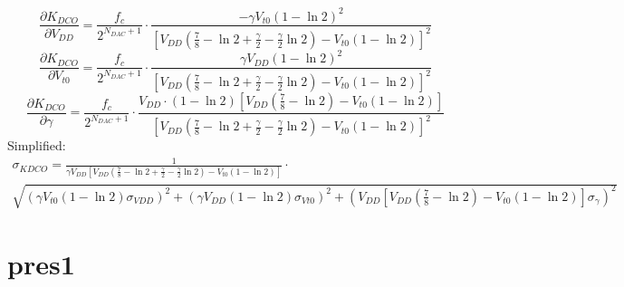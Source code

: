 \documentclass[10pt,a4paper]{article}
\begin{document}
	\begin{equation}
		\frac{\partial K_{DCO}}{\partial V_{DD}} = \frac{f_c}{2^{N_{DAC}+1}}\cdot\frac{-\gamma V_{t0}(1-\ln2)^2}{\left[ V_{DD}\left(\frac{7}{8}-\ln2+\frac{\gamma}{2}-\frac{\gamma}{2}\ln2\right)-V_{t0}\left(1-\ln2\right) \right]^2}
	\end{equation}
	\begin{equation}
		\frac{\partial K_{DCO}}{\partial V_{t0}} = \frac{f_c}{2^{N_{DAC}+1}}\cdot\frac{\gamma V_{DD}(1-\ln2)^2}{\left[ V_{DD}\left(\frac{7}{8}-\ln2+\frac{\gamma}{2}-\frac{\gamma}{2}\ln2\right)-V_{t0}\left(1-\ln2\right) \right]^2}
	\end{equation}
	\begin{equation}
		\frac{\partial K_{DCO}}{\partial \gamma} = \frac{f_c}{2^{N_{DAC}+1}}\cdot\frac{V_{DD}\cdot(1-\ln2) \left[ V_{DD}\left(\frac{7}{8}-\ln2\right)-V_{t0}\left(1-\ln2\right) \right]}{\left[ V_{DD}\left(\frac{7}{8}-\ln2+\frac{\gamma}{2}-\frac{\gamma}{2}\ln2\right)-V_{t0}\left(1-\ln2\right) \right]^2}
	\end{equation}
	Simplified:
	\begin{multline}
		\sigma_{KDCO} = \frac{1}{\gamma V_{DD} \left[ V_{DD}\left(\frac{7}{8}-\ln2+\frac{\gamma}{2}-\frac{\gamma}{2}\ln2\right)-V_{t0}\left(1-\ln2\right) \right]}\cdot\\ \sqrt{\left(\gamma V_{t0} (1-\ln2)\sigma_{VDD} \right)^2 + \left(\gamma V_{DD} (1-\ln2)\sigma_{Vt0} \right)^2 + \left( V_{DD}\left[ V_{DD}\left(\frac{7}{8}-\ln2\right)-V_{t0}\left(1-\ln2\right) \right]\sigma_{\gamma} \right)^2 }
	\end{multline}		

	\FloatBarrier
	\section{pres1}
\end{document}

